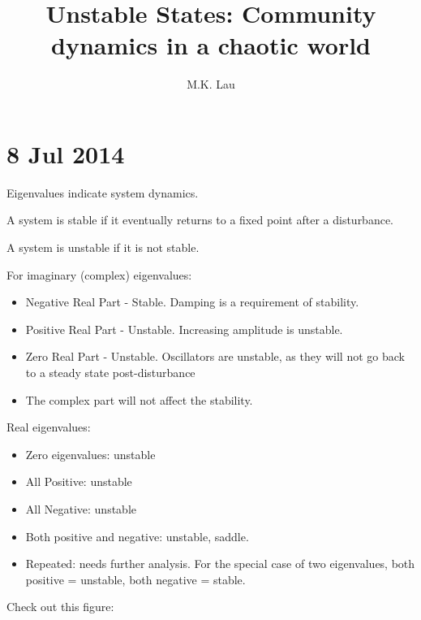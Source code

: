 \documentclass[12pt]{article}
\title{Unstable States: Community dynamics in a chaotic world}
\author{M.K. Lau}
\begin{document}
\maketitle



\section{8 Jul 2014}


Eigenvalues indicate system dynamics.

A system is stable if it eventually returns to a fixed point after a
disturbance.

A system is unstable if it is not stable.

For imaginary (complex) eigenvalues:

\begin{itemize}
\item Negative Real Part - Stable. Damping is a requirement of stability. 
\item Positive Real Part - Unstable. Increasing amplitude is unstable.
\item Zero Real Part - Unstable. Oscillators are unstable, as they
  will not go back to a steady state post-disturbance
\item The complex part will not affect the stability. 
\end{itemize}

Real eigenvalues:
\begin{itemize}
\item Zero eigenvalues: unstable
\item All Positive: unstable
\item All Negative: unstable
\item Both positive and negative: unstable, saddle.
\item Repeated: needs further analysis. For the special case of two
  eigenvalues, both positive = unstable, both negative = stable.
\end{itemize}

Check out this figure:
\end{document}
